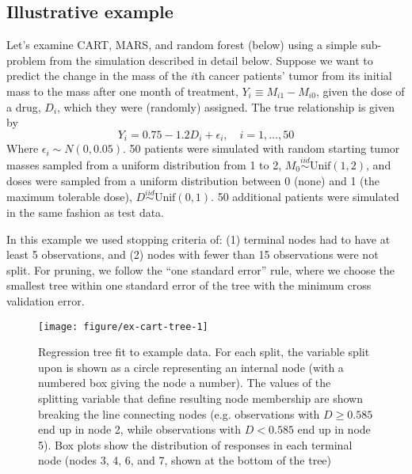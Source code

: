 \documentclass[12pt]{article}
\begin{document}

\subsection{Illustrative example} %
\label{sub:cart-ex}

Let's examine CART, MARS, and random forest (below) using a simple sub-problem from the simulation described in detail below. Suppose we want to predict the change in the mass of the $i$th cancer patients' tumor from its initial mass to the mass after one month of treatment, $Y_{i} \equiv M_{i1} - M_{i0}$, given the dose of a drug, $D_{i}$, which they were (randomly) assigned. The true relationship is given by
\begin{equation}
  Y_{i} = 0.75 - 1.2 D_{i} + \epsilon_{i}, \quad i = 1, \ldots, 50
\end{equation}
Where $\epsilon_{i} \sim N(0, 0.05)$. 50 patients were simulated with random starting tumor masses sampled from a uniform distribution from 1 to 2, $M_{0} \overset{iid}{\sim} \text{Unif}(1, 2)$, and doses were sampled from a uniform distribution between 0 (none) and 1 (the maximum tolerable dose), $D \overset{iid}{\sim} \text{Unif}(0, 1)$. 50 additional patients were simulated in the same fashion as test data.

In this example we used stopping criteria of: (1) terminal nodes had to have at least 5 observations, and (2) nodes with fewer than 15 observations were not split. For pruning, we follow the ``one standard error'' rule, where we choose the smallest tree within one standard error of the tree with the minimum cross validation error.

\begin{figure}[!htbp]
\centering
  \texttt{[image: figure/ex-cart-tree-1]}

\caption[Regression tree fit to example data]{Regression tree fit to example data. For each split, the variable split upon is shown as a circle representing an internal node (with a numbered box giving the node a number). The values of the splitting variable that define resulting node membership are shown breaking the line connecting nodes (e.g. observations with $D \geq 0.585$ end up in node 2, while observations with $D < 0.585$ end up in node 5). Box plots show the distribution of responses in each terminal node (nodes 3, 4, 6, and 7, shown at the bottom of the tree)}\label{fig:ex-cart-tree}
\end{figure}
\end{document}
